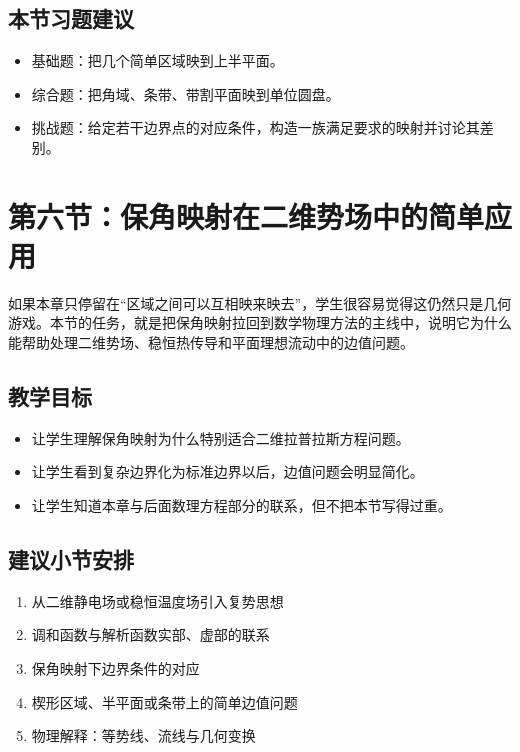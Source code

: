 \subsection*{本节习题建议}
\begin{itemize}
    \item 基础题：把几个简单区域映到上半平面。
    \item 综合题：把角域、条带、带割平面映到单位圆盘。
    \item 挑战题：给定若干边界点的对应条件，构造一族满足要求的映射并讨论其差别。
\end{itemize}

\section{第六节：保角映射在二维势场中的简单应用}

\begin{wulibj}[本节要解决的问题]
如果本章只停留在``区域之间可以互相映来映去''，学生很容易觉得这仍然只是几何游戏。本节的任务，就是把保角映射拉回到数学物理方法的主线中，说明它为什么能帮助处理二维势场、稳恒热传导和平面理想流动中的边值问题。
\end{wulibj}

\subsection*{教学目标}
\begin{itemize}
    \item 让学生理解保角映射为什么特别适合二维拉普拉斯方程问题。
    \item 让学生看到复杂边界化为标准边界以后，边值问题会明显简化。
    \item 让学生知道本章与后面数理方程部分的联系，但不把本节写得过重。
\end{itemize}

\subsection*{建议小节安排}
\begin{enumerate}
    \item 从二维静电场或稳恒温度场引入复势思想
    \item 调和函数与解析函数实部、虚部的联系
    \item 保角映射下边界条件的对应
    \item 楔形区域、半平面或条带上的简单边值问题
    \item 物理解释：等势线、流线与几何变换
\end{enumerate}


